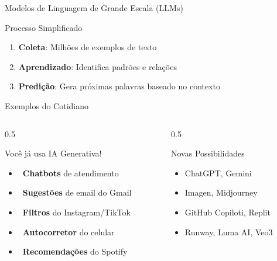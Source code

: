 \documentclass[aspectratio=169,12pt]{beamer}
\begin{document}
    \begin{frame}{Modelos de Linguagem de Grande Escala (LLMs)}
    \begin{block}{Processo Simplificado}
        \begin{enumerate}
            \item \textbf{Coleta}: Milhões de exemplos de texto
            \item \textbf{Aprendizado}: Identifica padrões e relações
            \item \textbf{Predição}: Gera próximas palavras baseado no contexto
        \end{enumerate}
    \end{block}
\end{frame}

\begin{frame}{Exemplos do Cotidiano}
    \begin{columns}
        \begin{column}{0.5\textwidth}
            \begin{exampleblock}{Você já usa IA Generativa!}
                \begin{itemize}
                    \item \faComments\, \textbf{Chatbots} de atendimento
                    \item \faEnvelope\, \textbf{Sugestões} de email do Gmail
                    \item \faCamera\, \textbf{Filtros} do Instagram/TikTok
                    \item \faKeyboard\, \textbf{Autocorretor} do celular
                    \item \faMusic\, \textbf{Recomendações} do Spotify
                \end{itemize}
            \end{exampleblock}
        \end{column}
        \begin{column}{0.5\textwidth}
            \begin{alertblock}{Novas Possibilidades}
                \begin{itemize}
                    \item \textcolor{accent}{\faRobot} ChatGPT, Gemini
                    \item \textcolor{secondary}{\faImage} Imagen, Midjourney
                    \item \textcolor{success}{\faCode} GitHub Copiloti, Replit
                    \item \textcolor{warning}{\faVideo} Runway, Luma AI, Veo3
                \end{itemize}
            \end{alertblock}
        \end{column}
    \end{columns}
\end{frame}
\end{document}
